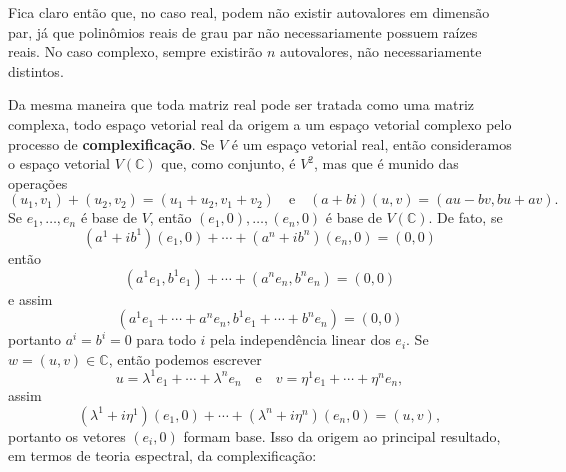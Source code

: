 Fica claro então que, no caso real, podem não existir autovalores em dimensão par, já que polinômios reais de grau par não necessariamente possuem raízes reais. No caso complexo, sempre existirão $n$ autovalores, não necessariamente distintos.

Da mesma maneira que toda matriz real pode ser tratada como uma matriz complexa, todo espaço vetorial real da origem a um espaço vetorial complexo pelo processo de \textbf{complexificação}. Se $V$ é um espaço vetorial real, então consideramos o espaço vetorial $V(\mathbb{C})$ que, como conjunto, é $V^2$, mas que é munido das operações \begin{equation}
    (u_1, v_1) + (u_2, v_2) = (u_1 + u_2, v_1 + v_2) \quad \text{e} \quad (a + bi)(u,v) = (au - bv, bu + av).
\end{equation} Se $e_1, \dots, e_n$ é base de $V$, então $(e_1, 0), \dots, (e_n, 0)$ é base de $V(\mathbb{C})$. De fato, se \begin{equation}
    (a^1 + ib^1) (e_1,0) + \cdots + (a^n + ib^n) (e_n, 0) = (0,0)
\end{equation} então \begin{equation}
    (a^1 e_1, b^1 e_1) + \cdots + (a^n e_n, b^n e_n) = (0,0)
\end{equation} e assim \begin{equation}
    (a^1 e_1 + \cdots + a^n e_n, b^1 e_1 + \cdots + b^n e_n) = (0,0)
\end{equation} portanto $a^i = b^i = 0$ para todo $i$ pela independência linear dos $e_i$. Se $w = (u,v) \in \mathbb{C}$, então podemos escrever \begin{equation}
    u = \lambda^1 e_1 + \cdots + \lambda^n e_n \quad \text{e} \quad v = \eta^1 e_1 + \cdots + \eta^n e_n,
\end{equation} assim \begin{equation}
    (\lambda^1 + i\eta^1) (e_1, 0) + \cdots + (\lambda^n + i\eta^n)(e_n, 0) = (u,v),
\end{equation} portanto os vetores $(e_i, 0)$ formam base. Isso da origem ao principal resultado, em termos de teoria espectral, da complexificação:


